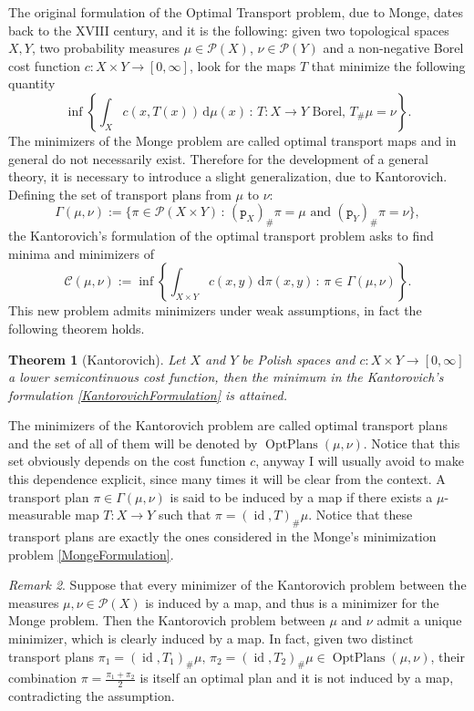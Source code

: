 \documentclass[11pt,twoside,a4paper]{article}
\DeclareMathOperator{\id}{id}
\newcommand{\p}{\mathtt p} %
\newcommand{\de}{\ensuremath{\, \mathrm d}} %
\newcommand{\suchthat}{\ensuremath{\,:\,}} %
\DeclareMathOperator{\OptPlans}{OptPlans}
\newcommand{\Prob}{\mathscr{P}}
\newcommand{\Cost}{\ensuremath{\mathcal C}} %
\theoremstyle{theorem}
\newtheorem{theorem}{Theorem}[section]
\theoremstyle{definition}
\theoremstyle{remark}
\newtheorem{remark}[theorem]{Remark}
\theoremstyle{proof}
\begin{document}
The original formulation of the Optimal Transport problem, due to Monge, dates back to the XVIII century, and it is the following: given two topological spaces $X,Y$, two probability measures $\mu\in\Prob(X)$, $\nu\in\Prob(Y)$ and a non-negative Borel cost function $c:X\times Y \to  [0,\infty]$, look for the maps $T$ that minimize the following quantity 
\begin{equation} \label{MongeFormulation}
	\inf\left\{ \int_X c(x,T(x)) \de \mu(x) \suchthat \text{$T:X\to Y$ Borel, $T_\# \mu =\nu$} \right\}. \tag{M}
\end{equation}
The minimizers of the Monge problem are called optimal transport maps and in general do not necessarily exist. Therefore for the development of a general theory, it is necessary to introduce a slight generalization, due to Kantorovich. Defining the set of transport plans from $\mu$ to $\nu$:
\begin{equation*}
\Gamma(\mu,\nu) := \{ \pi\in\Prob(X\times Y) \suchthat (\p_X)_\#\pi = \mu \,\,\text{and} \,\, (\p_Y)_\#\pi = \nu\},
\end{equation*}
the Kantorovich's formulation of the optimal transport problem asks to find minima and minimizers of
\begin{equation} \label{KantorovichFormulation}
\Cost(\mu,\nu):=	\inf \left\{ \int_{X\times Y} c(x,y) \de \pi(x,y) \suchthat \pi\in\Gamma(\mu,\nu) \right\}. \tag{K}
\end{equation}
This new problem admits minimizers under weak assumptions, in fact the following theorem holds.
\begin{theorem}[Kantorovich] \label{thm:MinimumInKantorovich}
	Let $X$ and $Y$ be Polish spaces and $c:X\times Y \to [0,\infty]$ a lower semicontinuous cost function, then the minimum in the Kantorovich's formulation \eqref{KantorovichFormulation} is attained.
\end{theorem}
The minimizers of the Kantorovich problem are called optimal transport plans and the set of all of them will be denoted by $\OptPlans(\mu,\nu)$. Notice that this set obviously depends on the cost function $c$, anyway I will usually avoid to make this dependence explicit, since many times it will be clear from the context. A transport plan $\pi\in\Gamma(\mu,\nu) $ is said to be induced by a map if there exists a $\mu$-measurable map $T:X \to Y$ such that $\pi=(\id,T)_\# \mu$. Notice that these transport plans are exactly the ones considered in the Monge's minimization problem \eqref{MongeFormulation}.

\begin{remark}\label{rem:uniquenessthroughmap}
Suppose that every minimizer of the Kantorovich problem between the measures $\mu,\nu\in\Prob(X)$ is induced by a map, and thus is a minimizer for the
Monge problem. Then the Kantorovich problem between $\mu$ and $\nu$ admit a unique minimizer, which is clearly induced by a map. In fact, given two distinct transport plans $\pi_1=(\id, T_1)_\#\mu,\,\pi_2=(\id, T_2)_\#\mu\in \OptPlans(\mu,\nu)$, their combination $\pi=\frac{\pi_1+\pi_2}{2}$ is itself an optimal plan and it is not induced by a map, contradicting the assumption.
\end{remark}
\end{document}

